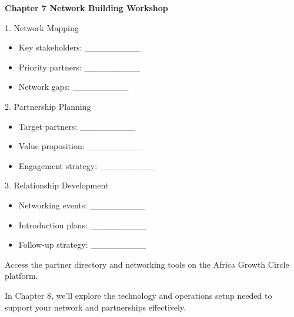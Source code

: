 \begin{workshopbox}
\textbf{Chapter 7 Network Building Workshop}

1. Network Mapping
\begin{itemize}
    \item Key stakeholders: \_\_\_\_\_\_\_\_\_
    \item Priority partners: \_\_\_\_\_\_\_\_\_
    \item Network gaps: \_\_\_\_\_\_\_\_\_
\end{itemize}

2. Partnership Planning
\begin{itemize}
    \item Target partners: \_\_\_\_\_\_\_\_\_
    \item Value proposition: \_\_\_\_\_\_\_\_\_
    \item Engagement strategy: \_\_\_\_\_\_\_\_\_
\end{itemize}

3. Relationship Development
\begin{itemize}
    \item Networking events: \_\_\_\_\_\_\_\_\_
    \item Introduction plans: \_\_\_\_\_\_\_\_\_
    \item Follow-up strategy: \_\_\_\_\_\_\_\_\_
\end{itemize}

Access the partner directory and networking tools on the Africa Growth Circle platform.
\end{workshopbox}

\begin{importantbox}
In Chapter 8, we'll explore the technology and operations setup needed to support your network and partnerships effectively.
\end{importantbox}